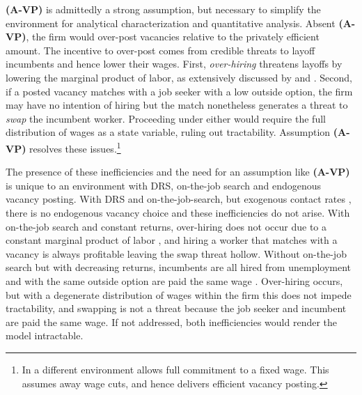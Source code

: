 \textbf{(A-VP)} is admittedly a strong assumption, but necessary to simplify the environment for analytical characterization and quantitative analysis.
Absent \textbf{(A-VP)}, the firm would over-post vacancies relative to the privately efficient amount.
The incentive to over-post comes from credible threats to layoff incumbents and hence lower their wages.
First, \emph{over-hiring} threatens layoffs by lowering the marginal product of labor, as extensively discussed by  \citet{StoleZwiebelRESTUD} and \citet{brugemann2018intra}.
Second, if a posted vacancy matches with a job seeker with a low outside option, the firm may have no intention of hiring but the match nonetheless generates a threat to \emph{swap} the incumbent worker.
Proceeding under either would require the full distribution of wages as a state variable, ruling out tractability.
Assumption \textbf{(A-VP)} resolves these issues.\footnote{
    In a different environment \citet{hawkins2015bargaining} allows full commitment to a fixed wage.
    This assumes away wage cuts, and hence delivers efficient vacancy posting.}

The presence of these inefficiencies and the need for an assumption like \textbf{(A-VP)} is unique to an environment with DRS, on-the-job search and endogenous vacancy posting. With DRS and on-the-job-search, but exogenous contact rates \citep[as in][]{kiyotaki2007model}, there is no endogenous vacancy choice and these inefficiencies do not arise.
With on-the-job search and constant returns, over-hiring does not occur due to a constant marginal product of labor \citep{postelvinayrobin2002},
and hiring a worker that matches with a vacancy is always profitable leaving the swap threat hollow.
Without on-the-job search but with decreasing returns, incumbents are all hired from unemployment and with the same outside option are paid the same wage \citep{ElsbyMichaelsAEJ,acemogluhawkins}.
Over-hiring occurs, but with a degenerate distribution of wages within the firm this does not impede tractability, and swapping is not a threat because the job seeker and incumbent are paid the same wage.
If not addressed, both inefficiencies would render the model intractable.

